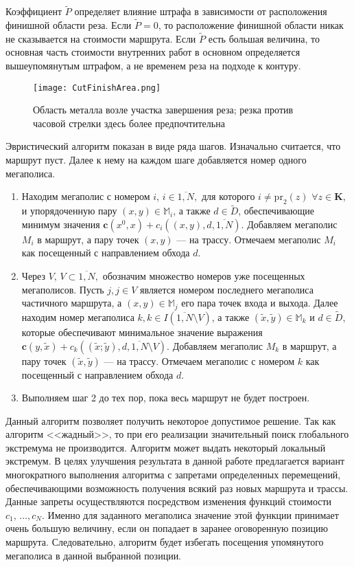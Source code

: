 Коэффициент $\tilde{P}$
определяет влияние штрафа в зависимости от расположения финишной области реза.
Если
$\tilde{P}=0$,
то расположение финишной области никак не
сказывается на стоимости маршрута.
Если $\tilde{P}$
есть большая величина,
то основная часть стоимости внутренних
работ в основном определяется вышеупомянутым штрафом,
а не временем реза на подходе к контуру.

\begin{figure}[H]
  \center
  \texttt{[image: CutFinishArea.png]}
  \caption{
    Область металла возле участка завершения реза;
    резка против часовой стрелки здесь более предпочтительна
  }
  \label{FinishCutArea}
\end{figure}

Эвристический алгоритм показан в виде ряда шагов.
Изначально считается, что маршрут пуст.
Далее к нему на каждом шаге добавляется номер одного мегаполиса.

\begin{enumerate}
  \item
  Находим мегаполис с номером $i$, $i\in \overline{1,N},$
  для которого
  $i\neq \mbox{pr}_2(z)$ $\forall z\in \mathbf{K}$,
  и упорядоченную пару
  $(x,y)\in \mathbb{M}_i$,
  а также $d\in \tilde{D}$,
  обеспечивающие минимум значения
  $\mathbf{c}(x^0,x)+c_i((x,y),d,\overline{1,N})$.
  Добавляем мегаполис $M_i$ в маршрут,
  а пару точек $(x,y)$ --- на трассу.
  Отмечаем мегаполис $M_i$ как посещенный с направлением обхода $d$.

  \item
  Через $V$, $V\subset \overline{1,N},$
  обозначим множество номеров уже посещенных мегаполисов.
  Пусть $j,j\in V$
  является номером последнего мегаполиса частичного маршрута,
  а $(x,y)\in \mathbb{M}_j$ его пара точек входа и выхода.
  Далее находим номер мегаполиса
  $k,k\in I(\overline{1,N}\setminus V)$,
  а также
  $(\tilde{x},\tilde{y})\in \mathbb{M}_k$ и $d\in \tilde{D}$,
  которые обеспечивают минимальное значение выражения
  $\mathbf{c}(y,\tilde{x})+c_k((\tilde{x};\tilde{y}),d,\overline{1,N}\setminus V)$.
  Добавляем мегаполис $M_k$ в маршрут, а пару точек $(\tilde{x},\tilde{y})$
  --- на трассу.
  Отмечаем мегаполис с номером $k$ как посещенный с направлением
  обхода $d$.

  \item
  Выполняем шаг 2 до тех пор,
  пока весь маршрут не будет построен.
\end{enumerate}

Данный алгоритм позволяет получить некоторое допустимое решение.
Так как алгоритм <<жадный>>,
то при его реализации значительный поиск глобального экстремума не производится.
Алгоритм может выдать некоторый локальный экстремум.
В целях улучшения результата в данной работе предлагается вариант
многократного выполнения алгоритма с запретами определенных перемещений,
обеспечивающими возможность получения всякий раз новых
маршрута и трассы.
Данные запреты осуществляются посредством изменения функций
стоимости $c_1,\,\dots,c_N$.
Именно для заданного мегаполиса значение этой функции
принимает очень большую величину,
если он попадает в заранее оговоренную позицию маршрута.
Следовательно, алгоритм будет избегать посещения упомянутого мегаполиса
в данной выбранной позиции.

